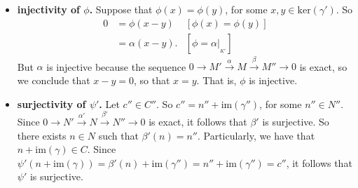 \documentclass[9pt]{article}
\begin{document}
\begin{enumerate}
      \begin{itemize}
         \item \textbf{injectivity of $\phi$.} Suppose that $\phi(x) = \phi(y)$,
               for some $x, y \in \text{ker}(\gamma')$. So
               \begin{align*}
                  0 &= \phi(x - y) &[\phi(x) = \phi(y)] \\
                    &= \alpha(x - y). &[\phi = \alpha|_{_{K'}}]
               \end{align*}
               But $\alpha$ is injective because the sequence $0 \rightarrow M'
               \stackrel{\alpha}{\longrightarrow} M
               \stackrel{\beta}{\longrightarrow}M'' \rightarrow 0$ is exact, so
               we conclude that $x - y = 0$, so that $x = y$. That is, $\phi$ is
               injective.
         \item \textbf{surjectivity of $\psi'$.} Let $c'' \in C''$. So
               $c'' = n'' + \text{im}(\gamma'')$, for some $n'' \in N''$. Since
               $0 \rightarrow N'\stackrel{\alpha'}{\longrightarrow} N
               \stackrel{\beta'}{\longrightarrow}N'' \rightarrow 0$ is exact, it
               follows that $\beta'$ is surjective. So there exists $n \in N$
               such that $\beta'(n) = n''$. Particularly, we have that
               $n + \text{im}(\gamma) \in C$. Since
               $\psi'(n + \text{im}(\gamma)) = \beta'(n) + \text{im}(\gamma'') =
                n'' + \text{im}(\gamma'') = c''$, it follows that $\psi'$ is
               surjective.
      \end{itemize}
\end{enumerate}
\end{document}
